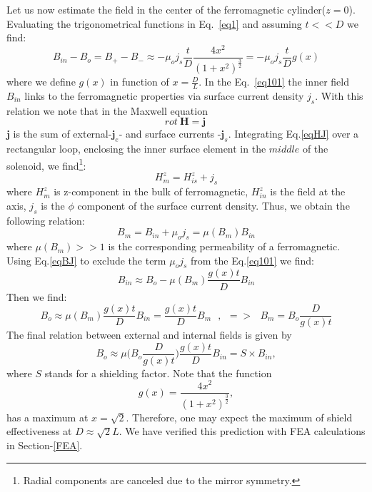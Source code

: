 \documentclass[12pt]{article}
\begin{document}
Let us now estimate the field in the center of the ferromagnetic cylinder($z=0$).
Evaluating the trigonometrical functions in  Eq.~\ref{eq1} and assuming  $t<<D$
we find:
%
\begin{equation}
B_{in}-B_o = B_+ - B_- \approx - \mu_o j_s  \frac{t}{D} \frac{4x^2} {(1+x^2)^{\frac{3}{2}}}
= - \mu_o j_s \frac{t}{D} g(x)
\label{eq101}
\end{equation}
where we define  $g(x)$ in  function of  $x=\frac{D}{L}$.
In the Eq.~\ref{eq101} the inner field $B_{in}$
links to the  ferromagnetic properties 
via surface current density  $j_s$. With this 
relation we note that in  the Maxwell equation
\begin{equation}
rot~\textbf{H} = \textbf{j} ~
\label{eqHJ}
\end{equation}
$\textbf{j}$ %
is the sum of external-$\textbf{j}_e$-  and
surface   currents -$\textbf{j}_s$.
Integrating Eq.\ref{eqHJ} over a rectangular loop, enclosing the inner surface element 
in the $middle$ of the solenoid, we find\footnote{Radial components are canceled due to the mirror symmetry.}:
%
\begin{equation}
                  H_m^z =H_{is}^z+j_s
\label{eqBJ1}
\end{equation}
%
where $H_m^z$ is   z-component  in the bulk of   ferromagnetic,
$H_{in}^z$ is the field at the  axis, 
$j_s$ is the $\phi$ component of the surface current density.
Thus,  we obtain the following  relation:
%
\begin{equation}
B_m = B_{in}+\mu_o j_s=\mu(B_m)B_{in}   %
\label{eqBJ}
\end{equation}
%
where $\mu(B_m)>>1$ is the corresponding permeability  of a  ferromagnetic.
Using  Eq.\ref{eqBJ}  to exclude  the term  %
$\mu_o j_s$ from the Eq.\ref{eq101} we find:
%
\begin{equation}
B_{in}\approx B_o - \mu(B_m)  \frac{g(x)t}{D}  B_{in}
\label{eq11}
\end{equation}
%
Then we find:
%
\begin{equation}
B_{o}\approx
\mu(B_m)\frac{g(x)t}{D} B_{in}=
\frac{g(x)t}{D}B_{m}~~~, ~~ => ~~~B_{m}=B_o\frac{D}{g(x)t}
\label{eq12}
\end{equation}
%
The final relation between external and internal fields is given by
%
\begin{equation}
B_o \approx \mu\bigg(B_o 
\frac{D}{g(x)t}\bigg) \frac{g(x)t }{D} B_{in}=S \times B_{in} ,
\label{eqfinal}
\end{equation}
%
where $S$ stands for a shielding factor.
Note that  the function
%
\begin{equation}
 g(x)=\frac{4x^2}{(1+x^2)^{\frac{3}{2}}},
\label{sf01}
\end{equation}
has a maximum at $x=\sqrt2$. Therefore, one may  expect the maximum of shield
effectiveness at $D \approx \sqrt2L$.  We have verified this prediction  with 
FEA calculations in Section-\ref{FEA}.
\end{document}
